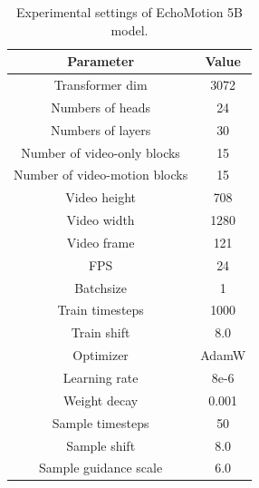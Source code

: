\begin{table}[ht]
\setlength{\abovecaptionskip}{0.2cm}
\setlength{\belowcaptionskip}{-0.4cm}
\centering
\caption{Experimental settings of EchoMotion 5B model.}
\setlength{\tabcolsep}{10mm}
\begin{tabular}{cc}
\hline
\textbf{Parameter}    & \textbf{Value} \\ \hline
Transformer dim       & 3072           \\
Numbers of heads      & 24             \\
Numbers of layers     & 30             \\
Number of video-only blocks & 15        \\
Number of video-motion blocks & 15     \\
Video height          & 708            \\
Video width           & 1280            \\
Video frame           & 121            \\
FPS                   & 24             \\
Batchsize             & 1              \\
Train timesteps       & 1000           \\
Train shift           & 8.0            \\
Optimizer             & AdamW          \\
Learning rate         & 8e-6           \\
Weight decay          & 0.001          \\
Sample timesteps      & 50             \\
Sample shift          & 8.0            \\
Sample guidance scale & 6.0            \\ \hline
\end{tabular}
\label{tab:settings_5b}
\end{table}